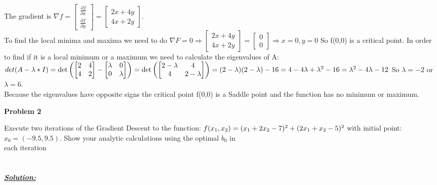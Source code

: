 \documentclass{article}
\begin{document}
  \noindent The gradient is $\nabla f=
  \begin{bmatrix}
    \frac{\partial f}{\partial x} \\
    \frac{\partial f}{\partial y}
  \end{bmatrix} =
  \begin{bmatrix}
    2x+4y \\
    4x+2y
  \end{bmatrix}
  $. \\To find the local minima and maxima we need to do $\nabla F=0 \Rightarrow 
  \begin{bmatrix}
    2x+4y \\
    4x+2y
  \end{bmatrix} =
  \begin{bmatrix}
    0 \\ 0
  \end{bmatrix} \Rightarrow x=0, y=0
  $
  So f(0,0) is a critical point. In order to find if it is a local minimum or a maximum we need to calculate the eigenvalues of A:\\
  ${det(A - \lambda*I)} = \det \left ( \begin{bmatrix}
    2 & 4 \\
    4 & 2
  \end{bmatrix} 
  -\begin{bmatrix}
    \lambda & 0 \\
    0 & \lambda
  \end{bmatrix} \right )  = 
  \det \left (\begin{bmatrix}
    2-\lambda & 4 \\
    4 & 2-\lambda
\end{bmatrix} \right ) = (2-\lambda)(2-\lambda)-16=\\4-4\lambda+\lambda^2-16=\lambda^2-4\lambda-12$ 
So $\lambda = -2 $ or $\lambda = 6$. \\
Because the eigenvalues have opposite signs the critical point f(0,0) is a Saddle point and the function has no minimum or maximum.






\newpage
\noindent \textbf{Problem 2}

\noindent Execute two iterations of the Gradient Descent to the function: $f(x_1,x_2) = (x_1+2x_2-7)^2 + (2x_1+ \\ x_2-5)^2$ with initial point: $x_0 = (-9.5,9.5)$. Show your analytic calculations
 using the optimal $b_0$ in \\ each iteration\\ \\ \\
\underline{\textbf{\textit{Solution:}}}
\end{document}
